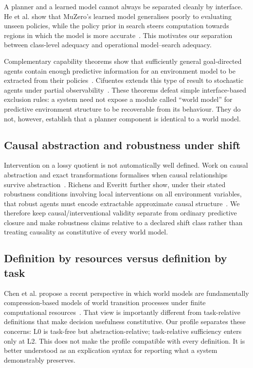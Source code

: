 \documentclass[10pt]{article}
\begin{document}
A planner and a learned model cannot always be separated cleanly by interface. He et al. show that MuZero's learned model generalises poorly to evaluating unseen policies, while the policy prior in search steers computation towards regions in which the model is more accurate~\cite{he2024}. This motivates our separation between class-level adequacy and operational model--search adequacy.

Complementary capability theorems show that sufficiently general goal-directed agents contain enough predictive information for an environment model to be extracted from their policies~\cite{richens2025}. Cifuentes extends this type of result to stochastic agents under partial observability~\cite{cifuentes2026}. These theorems defeat simple interface-based exclusion rules: a system need not expose a module called ``world model'' for predictive environment structure to be recoverable from its behaviour. They do not, however, establish that a planner component is identical to a world model.

\subsection{Causal abstraction and robustness under shift}

Intervention on a lossy quotient is not automatically well defined. Work on causal abstraction and exact transformations formalises when causal relationships survive abstraction~\cite{rubenstein2017,beckers2019}. Richens and Everitt further show, under their stated robustness conditions involving local interventions on all environment variables, that robust agents must encode extractable approximate causal structure~\cite{richens2024}. We therefore keep causal/interventional validity separate from ordinary predictive closure and make robustness claims relative to a declared shift class rather than treating causality as constitutive of every world model.

\subsection{Definition by resources versus definition by task}

Chen et al. propose a recent perspective in which world models are fundamentally compression-based models of world transition processes under finite computational resources~\cite{chen2026}. That view is importantly different from task-relative definitions that make decision usefulness constitutive. Our profile separates these concerns: L0 is task-free but abstraction-relative; task-relative sufficiency enters only at L2. This does not make the profile compatible with every definition. It is better understood as an explication syntax for reporting what a system demonstrably preserves.
\end{document}
